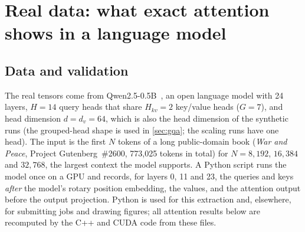 \section{Real data: what exact attention shows in a language model}\label{sec:real}

\subsection{Data and validation}
The real tensors come from Qwen2.5-0.5B~\cite{qwen}, an open language model with 24
layers, $H=14$ query heads that share $H_{kv}=2$ key/value heads ($G=7$), and head
dimension $d=d_v=64$, which is also the head dimension of the synthetic runs (the
grouped-head shape is used in \cref{sec:gqa}; the scaling runs have one head). The input
is the first $N$ tokens of a long public-domain book (\emph{War and Peace}, Project
Gutenberg~\#2600, 773{,}025 tokens in total) for $N=8{,}192$, $16{,}384$ and
$32{,}768$, the largest context the model supports. A Python script runs the model
once on a GPU and records, for layers 0, 11 and 23, the queries and keys \emph{after}
the model's rotary position embedding, the values, and the attention output before
the output projection. Python is used for this extraction and, elsewhere, for
submitting jobs and drawing figures; all attention results below are recomputed by
the C++ and CUDA code from these files.


